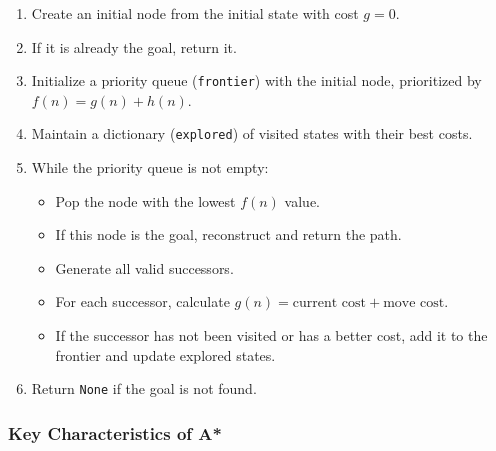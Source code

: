 \begin{enumerate}
    \item Create an initial node from the initial state with cost $g = 0$.
    \item If it is already the goal, return it.
    \item Initialize a priority queue (\texttt{frontier}) with the initial node, prioritized by $f(n) = g(n) + h(n)$.
    \item Maintain a dictionary (\texttt{explored}) of visited states with their best costs.
    \item While the priority queue is not empty:
    \begin{itemize}
        \item Pop the node with the lowest $f(n)$ value.
        \item If this node is the goal, reconstruct and return the path.
        \item Generate all valid successors.
        \item For each successor, calculate $g(n) = \text{current cost} + \text{move cost}$.
        \item If the successor has not been visited or has a better cost, add it to the frontier and update explored states.
    \end{itemize}
    \item Return \texttt{None} if the goal is not found.
\end{enumerate}

\subsubsection*{Key Characteristics of A*}

